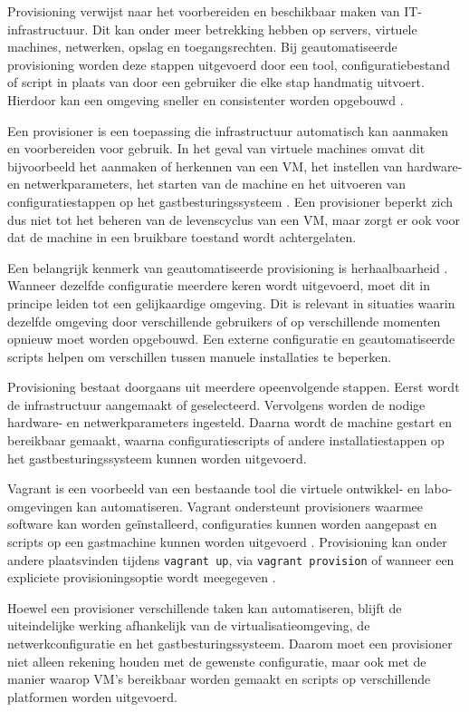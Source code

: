 Provisioning verwijst naar het voorbereiden en beschikbaar maken van IT-infrastructuur. Dit kan onder meer betrekking hebben op servers, virtuele machines, netwerken, opslag en toegangsrechten. Bij geautomatiseerde provisioning worden deze stappen uitgevoerd door een tool, configuratiebestand of script in plaats van door een gebruiker die elke stap handmatig uitvoert. Hierdoor kan een omgeving sneller en consistenter worden opgebouwd \autocite{RedHat2026}.

Een provisioner is een toepassing die infrastructuur automatisch kan aanmaken en voorbereiden voor gebruik. In het geval van virtuele machines omvat dit bijvoorbeeld het aanmaken of herkennen van een VM, het instellen van hardware- en netwerkparameters, het starten van de machine en het uitvoeren van configuratiestappen op het gastbesturingssysteem \autocite{RedHat2026,HashiCorp2025}. Een provisioner beperkt zich dus niet tot het beheren van de levenscyclus van een VM, maar zorgt er ook voor dat de machine in een bruikbare toestand wordt achtergelaten.

Een belangrijk kenmerk van geautomatiseerde provisioning is herhaalbaarheid \autocite{Holdsworth2025}. Wanneer dezelfde configuratie meerdere keren wordt uitgevoerd, moet dit in principe leiden tot een gelijkaardige omgeving. Dit is relevant in situaties waarin dezelfde omgeving door verschillende gebruikers of op verschillende momenten opnieuw moet worden opgebouwd. Een externe configuratie en geautomatiseerde scripts helpen om verschillen tussen manuele installaties te beperken.

Provisioning bestaat doorgaans uit meerdere opeenvolgende stappen. Eerst wordt de infrastructuur aangemaakt of geselecteerd. Vervolgens worden de nodige hardware- en netwerkparameters ingesteld. Daarna wordt de machine gestart en bereikbaar gemaakt, waarna configuratiescripts of andere installatiestappen op het gastbesturingssysteem kunnen worden uitgevoerd.

Vagrant is een voorbeeld van een bestaande tool die virtuele ontwikkel- en labo-omgevingen kan automatiseren. Vagrant ondersteunt provisioners waarmee software kan worden geïnstalleerd, configuraties kunnen worden aangepast en scripts op een gastmachine kunnen worden uitgevoerd \autocite{HashiCorp2025}. Provisioning kan onder andere plaatsvinden tijdens \texttt{vagrant up}, via \texttt{vagrant provision} of wanneer een expliciete provisioningsoptie wordt meegegeven \autocite{HashiCorp2025}.

Hoewel een provisioner verschillende taken kan automatiseren, blijft de uiteindelijke werking afhankelijk van de virtualisatieomgeving, de netwerkconfiguratie en het gastbesturingssysteem. Daarom moet een provisioner niet alleen rekening houden met de gewenste configuratie, maar ook met de manier waarop VM's bereikbaar worden gemaakt en scripts op verschillende platformen worden uitgevoerd.


